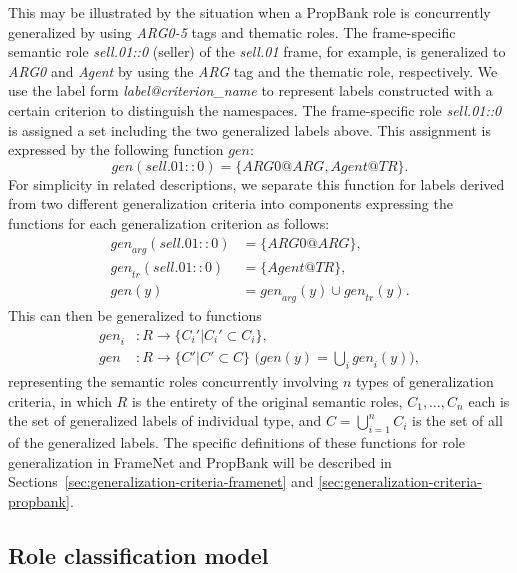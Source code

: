 \documentclass[english]{jnlp_1.4_rep}
\begin{document}
This may be illustrated by the situation when a PropBank role is concurrently generalized by using {\it ARG0-5} tags and thematic roles. The frame-specific semantic role {\it sell.01::0} (seller) of the {\it sell.01} frame, for example, is generalized to {\it ARG0} and {\it Agent} by using the {\it ARG} tag and the thematic role, respectively. We use the label form {\it label@criterion\_name} to represent labels constructed with a certain criterion to distinguish the namespaces. The frame-specific role {\it sell.01::0} is assigned a set including the two generalized labels above. This assignment is expressed by the following function $gen$:
\begin{equation}
 \mathit{gen}(\mathit{sell.01::0})= \{\mathit{ARG0@ARG}, \mathit{Agent@TR}\}.
\end{equation}
For simplicity in related descriptions, we separate this function for labels derived from two different generalization criteria into components expressing the functions for each generalization criterion as follows:
\begin{align}
\mathit{gen}_\mathit{arg}(\mathit{sell.01::0}) & = \{\mathit{ARG0@ARG}\} \label{eqn:arg},\\
\mathit{gen}_\mathit{tr}(\mathit{sell.01::0}) & = \{\mathit{Agent@TR}\} \label{eqn:thematic},\\
\mathit{gen}(y) & = \mathit{gen}_\mathit{arg}(y) \cup \mathit{gen}_\mathit{tr}(y).
\end{align}
This can then be generalized to functions
\begin{align}
\mathit{gen}_i & : R \rightarrow\{C_i'|C_i'\subset C_i\},\\
\mathit{gen} &: R \rightarrow\{C'|C'\subset C\}\mbox{ (}\mathit{gen}(y) = \bigcup_{i}\mathit{gen}_i(y)),
\end{align}
representing the semantic roles concurrently involving $n$ types of generalization criteria, in which $R$ is the entirety of the original semantic roles, $C_1, \ldots , C_n$ each is the set of generalized labels of individual type, and $C= \bigcup_{i=1}^{n}C_i$ is the set of all of the generalized labels.
The specific definitions of these functions for role generalization in FrameNet and PropBank will be described in Sections~\ref{sec:generalization-criteria-framenet} and \ref{sec:generalization-criteria-propbank}.


\subsection{Role classification model}
\end{document}
